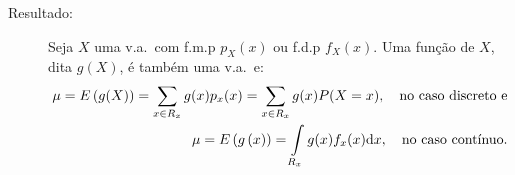 \begin{description}
         \item [Resultado:] Seja $X$ uma v.a.\ com f.m.p $p_{X}(x)$ ou f.d.p $f_{X}(x)$. Uma função
           de $X$, dita $g(X)$, é também uma v.a.\ e: 
           \begin{align}
             \mu=E\left(g(X)\right)=\sum \limits_{x \in R_{x}} g(x)p_{x}(x)
             =\sum \limits_{x \in R_{x}} g(x)P(X=x), \text{\quad no caso discreto e} \nonumber \\
          \mu=   E\left(g \left(x \right)\right)=\int \limits_{R_{x}} g(x)f_{x}(x)\mathrm{d}x, \text{\quad no caso contínuo.}
           \end{align}

       \end{description}

